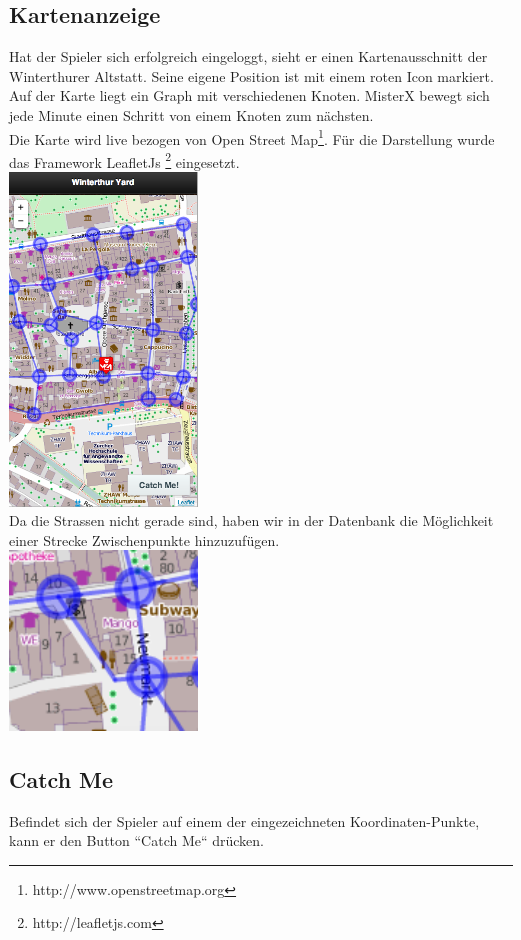 \documentclass[11pt]{article}
\begin{document}
\subsection{Kartenanzeige}
Hat der Spieler sich erfolgreich eingeloggt, sieht er einen  Kartenausschnitt der Winterthurer Altstatt. Seine eigene Position ist 
mit einem roten Icon markiert.  \\ 

Auf der Karte liegt ein Graph mit verschiedenen Knoten. MisterX bewegt sich jede Minute einen Schritt von einem Knoten zum nächsten.  \\

Die Karte wird live bezogen von Open Street Map\footnote{http://www.openstreetmap.org}. Für die Darstellung wurde das Framework LeafletJs \footnote{http://leafletjs.com} eingesetzt. \\
\includegraphics[width=5cm]{Bilder/rotesSymbol.png} \\
Da die Strassen nicht gerade sind, haben wir in der Datenbank die Möglichkeit einer Strecke Zwischenpunkte hinzuzufügen.  \\
\includegraphics[width=5cm]{Bilder/strassenecke.png}

\subsection{Catch Me}
Befindet sich der Spieler auf einem der eingezeichneten Koordinaten-Punkte, kann er den Button ``Catch Me`` drücken. 
\end{document}
